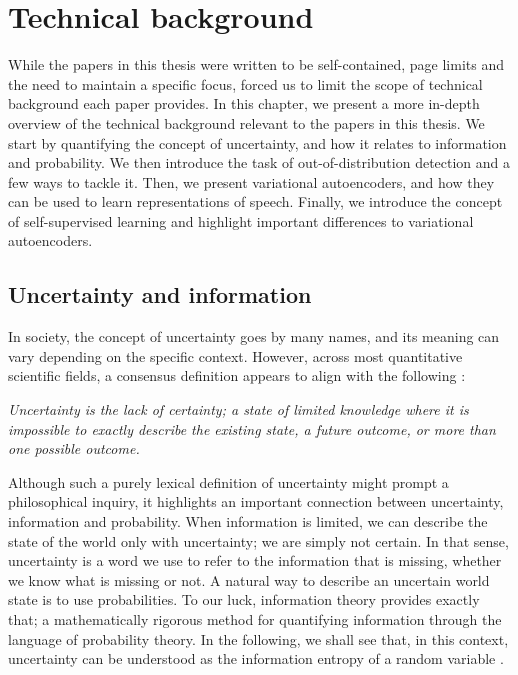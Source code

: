 

\chapter[technical background]{Technical background}\label{chp:technical-background}

While the papers in this thesis were written to be self-contained, page limits and the need to maintain a specific focus, forced us to limit the scope of technical background each paper provides. In this chapter, we present a more in-depth overview of the technical background relevant to the papers in this thesis. 
We start by quantifying the concept of uncertainty, and how it relates to information and probability. We then introduce the task of out-of-distribution detection and a few ways to tackle it. 
Then, we present variational autoencoders, and how they can be used to learn representations of speech. Finally, we introduce the concept of self-supervised learning and highlight important differences to variational autoencoders. 


\section{Uncertainty and information}

In society, the concept of uncertainty goes by many names, and its meaning can vary depending on the specific context. However, across most quantitative scientific fields, a consensus definition appears to align with the following \cite{hubbard_how_2014}:
%
\begin{center}
    \textit{Uncertainty is the lack of certainty; a state of limited knowledge where it is impossible to exactly describe the existing state, a future outcome, or more than one possible outcome.}
\end{center}
%
Although such a purely lexical definition of uncertainty might prompt a philosophical inquiry, it highlights an important connection between uncertainty, information and probability. When information is limited, we can describe the state of the world only with uncertainty; we are simply not certain. In that sense, uncertainty is a word we use to refer to the information that is missing, whether we know what is missing or not. 
A natural way to describe an uncertain world state is to use probabilities. To our luck, information theory provides exactly that; a mathematically rigorous method for quantifying information through the language of probability theory. In the following, we shall see that, in this context, uncertainty can be understood as the information entropy of a random variable \cite{mackay_information_2003}. 


